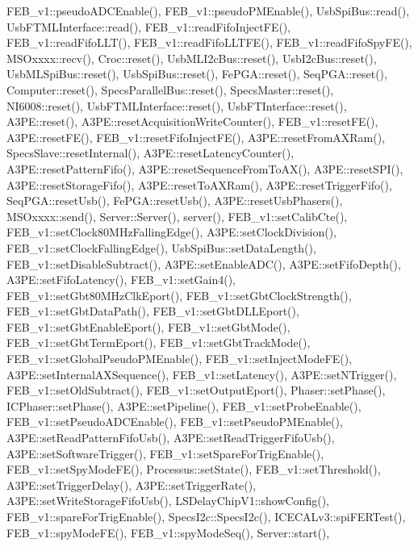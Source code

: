 F\+E\+B\+\_\+v1\+::pseudo\+A\+D\+C\+Enable(), F\+E\+B\+\_\+v1\+::pseudo\+P\+M\+Enable(), Usb\+Spi\+Bus\+::read(), Usb\+F\+T\+M\+L\+Interface\+::read(), F\+E\+B\+\_\+v1\+::read\+Fifo\+Inject\+F\+E(), F\+E\+B\+\_\+v1\+::read\+Fifo\+L\+L\+T(), F\+E\+B\+\_\+v1\+::read\+Fifo\+L\+L\+T\+F\+E(), F\+E\+B\+\_\+v1\+::read\+Fifo\+Spy\+F\+E(), M\+S\+Oxxxx\+::recv(), Croc\+::reset(), Usb\+M\+L\+I2c\+Bus\+::reset(), Usb\+I2c\+Bus\+::reset(), Usb\+M\+L\+Spi\+Bus\+::reset(), Usb\+Spi\+Bus\+::reset(), Fe\+P\+G\+A\+::reset(), Seq\+P\+G\+A\+::reset(), Computer\+::reset(), Specs\+Parallel\+Bus\+::reset(), Specs\+Master\+::reset(), N\+I6008\+::reset(), Usb\+F\+T\+M\+L\+Interface\+::reset(), Usb\+F\+T\+Interface\+::reset(), A3\+P\+E\+::reset(), A3\+P\+E\+::reset\+Acquisition\+Write\+Counter(), F\+E\+B\+\_\+v1\+::reset\+F\+E(), A3\+P\+E\+::reset\+F\+E(), F\+E\+B\+\_\+v1\+::reset\+Fifo\+Inject\+F\+E(), A3\+P\+E\+::reset\+From\+A\+X\+Ram(), Specs\+Slave\+::reset\+Internal(), A3\+P\+E\+::reset\+Latency\+Counter(), A3\+P\+E\+::reset\+Pattern\+Fifo(), A3\+P\+E\+::reset\+Sequence\+From\+To\+A\+X(), A3\+P\+E\+::reset\+S\+P\+I(), A3\+P\+E\+::reset\+Storage\+Fifo(), A3\+P\+E\+::reset\+To\+A\+X\+Ram(), A3\+P\+E\+::reset\+Trigger\+Fifo(), Seq\+P\+G\+A\+::reset\+Usb(), Fe\+P\+G\+A\+::reset\+Usb(), A3\+P\+E\+::reset\+Usb\+Phasers(), M\+S\+Oxxxx\+::send(), Server\+::\+Server(), server(), F\+E\+B\+\_\+v1\+::set\+Calib\+Cte(), F\+E\+B\+\_\+v1\+::set\+Clock80\+M\+Hz\+Falling\+Edge(), A3\+P\+E\+::set\+Clock\+Division(), F\+E\+B\+\_\+v1\+::set\+Clock\+Falling\+Edge(), Usb\+Spi\+Bus\+::set\+Data\+Length(), F\+E\+B\+\_\+v1\+::set\+Disable\+Subtract(), A3\+P\+E\+::set\+Enable\+A\+D\+C(), A3\+P\+E\+::set\+Fifo\+Depth(), A3\+P\+E\+::set\+Fifo\+Latency(), F\+E\+B\+\_\+v1\+::set\+Gain4(), F\+E\+B\+\_\+v1\+::set\+Gbt80\+M\+Hz\+Clk\+Eport(), F\+E\+B\+\_\+v1\+::set\+Gbt\+Clock\+Strength(), F\+E\+B\+\_\+v1\+::set\+Gbt\+Data\+Path(), F\+E\+B\+\_\+v1\+::set\+Gbt\+D\+L\+L\+Eport(), F\+E\+B\+\_\+v1\+::set\+Gbt\+Enable\+Eport(), F\+E\+B\+\_\+v1\+::set\+Gbt\+Mode(), F\+E\+B\+\_\+v1\+::set\+Gbt\+Term\+Eport(), F\+E\+B\+\_\+v1\+::set\+Gbt\+Track\+Mode(), F\+E\+B\+\_\+v1\+::set\+Global\+Pseudo\+P\+M\+Enable(), F\+E\+B\+\_\+v1\+::set\+Inject\+Mode\+F\+E(), A3\+P\+E\+::set\+Internal\+A\+X\+Sequence(), F\+E\+B\+\_\+v1\+::set\+Latency(), A3\+P\+E\+::set\+N\+Trigger(), F\+E\+B\+\_\+v1\+::set\+Old\+Subtract(), F\+E\+B\+\_\+v1\+::set\+Output\+Eport(), Phaser\+::set\+Phase(), I\+C\+Phaser\+::set\+Phase(), A3\+P\+E\+::set\+Pipeline(), F\+E\+B\+\_\+v1\+::set\+Probe\+Enable(), F\+E\+B\+\_\+v1\+::set\+Pseudo\+A\+D\+C\+Enable(), F\+E\+B\+\_\+v1\+::set\+Pseudo\+P\+M\+Enable(), A3\+P\+E\+::set\+Read\+Pattern\+Fifo\+Usb(), A3\+P\+E\+::set\+Read\+Trigger\+Fifo\+Usb(), A3\+P\+E\+::set\+Software\+Trigger(), F\+E\+B\+\_\+v1\+::set\+Spare\+For\+Trig\+Enable(), F\+E\+B\+\_\+v1\+::set\+Spy\+Mode\+F\+E(), Processus\+::set\+State(), F\+E\+B\+\_\+v1\+::set\+Threshold(), A3\+P\+E\+::set\+Trigger\+Delay(), A3\+P\+E\+::set\+Trigger\+Rate(), A3\+P\+E\+::set\+Write\+Storage\+Fifo\+Usb(), L\+S\+Delay\+Chip\+V1\+::show\+Config(), F\+E\+B\+\_\+v1\+::spare\+For\+Trig\+Enable(), Specs\+I2c\+::\+Specs\+I2c(), I\+C\+E\+C\+A\+Lv3\+::spi\+F\+E\+R\+Test(), F\+E\+B\+\_\+v1\+::spy\+Mode\+F\+E(), F\+E\+B\+\_\+v1\+::spy\+Mode\+Seq(), Server\+::start(), 